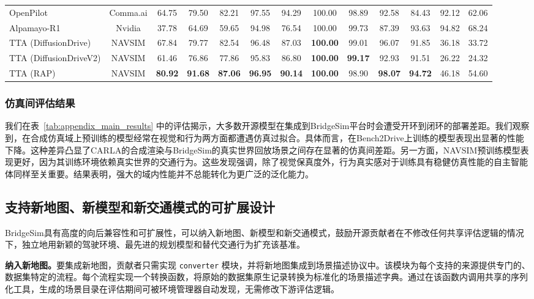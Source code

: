 \documentclass{article}
\begin{document}
\begin{table}[h]
{\begin{tabular}{l|c|c|cc|cccccccc}
\midrule

OpenPilot & Comma.ai & 64.75 & 79.50 & 82.21 & 97.55 & 94.29 & 100.00 & 98.89 & 92.58 & 84.43 & 92.12 & 62.06 \\
Alpamayo-R1 & Nvidia & 37.78 & 64.69 & 59.65 & 94.98 & 76.54 & 100.00 & 99.73 & 87.39 & 93.63 & 94.82 & 68.24 \\

\midrule
\rowcolor{green!15} TTA \scriptsize (DiffusionDrive) & NAVSIM & 67.84 & 79.77 & 82.54 & 96.48 & 87.03 & \textbf{100.00} & 99.01 & 96.07 & 91.85 & 36.18 & 33.72 \\
\rowcolor{green!15} TTA \scriptsize (DiffusionDriveV2) & NAVSIM & 61.46 & 76.86 & 77.86 & 95.83 & 86.80 & \textbf{100.00} & \textbf{99.17} & 92.93 & 91.51 & 26.22 & 24.32 \\
\rowcolor{green!15} TTA \scriptsize (RAP) & NAVSIM & \textbf{80.92} & \textbf{91.68} & \textbf{87.06} & \textbf{96.95} & \textbf{90.14} & \textbf{100.00} & 98.90 & \textbf{98.07} & \textbf{94.72} & 46.18 & 54.60 \\

\bottomrule
\end{tabular}}
\end{table}

\subsubsection{仿真间评估结果}
我们在表~\ref{tab:appendix_main_results} 中的评估揭示，大多数开源模型在集成到BridgeSim平台时会遭受开环到闭环的部署差距。我们观察到，在合成仿真域上预训练的模型经常在视觉和行为两方面都遭遇仿真过拟合。具体而言，在Bench2Drive上训练的模型表现出显著的性能下降。这种差异凸显了CARLA的合成渲染与BridgeSim的真实世界回放场景之间存在显著的仿真间差距。另一方面，NAVSIM预训练模型表现更好，因为其训练环境依赖真实世界的交通行为。这些发现强调，除了视觉保真度外，行为真实感对于训练具有稳健仿真性能的自主智能体同样至关重要。结果表明，强大的域内性能并不总能转化为更广泛的泛化能力。

\subsection{支持新地图、新模型和新交通模式的可扩展设计}
\label{appendix:extensibility}

BridgeSim具有高度的向后兼容性和可扩展性，可以纳入新地图、新模型和新交通模式，鼓励开源贡献者在不修改任何共享评估逻辑的情况下，独立地用新颖的驾驶环境、最先进的规划模型和替代交通行为扩充该基准。

\textbf{纳入新地图。}要集成新地图，贡献者只需实现 \texttt{converter} 模块，并将新地图集成到场景描述协议中。该模块为每个支持的来源提供专门的、数据集特定的流程。每个流程实现一个转换函数，将原始的数据集原生记录转换为标准化的场景描述字典。通过在该函数内调用共享的序列化工具，生成的场景目录在评估期间可被环境管理器自动发现，无需修改下游评估逻辑。
\end{document}
